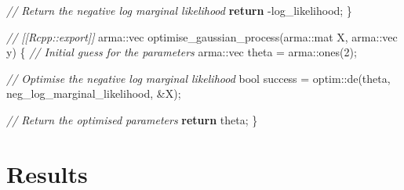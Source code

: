 \documentclass[
]{article}
\newenvironment{Shaded}{\begin{snugshade}}{\end{snugshade}}
\newcommand{\CommentTok}[1]{\textcolor[rgb]{0.56,0.35,0.01}{\textit{#1}}}
\newcommand{\ControlFlowTok}[1]{\textcolor[rgb]{0.13,0.29,0.53}{\textbf{#1}}}
\newcommand{\DataTypeTok}[1]{\textcolor[rgb]{0.13,0.29,0.53}{#1}}
\newcommand{\DecValTok}[1]{\textcolor[rgb]{0.00,0.00,0.81}{#1}}
\newcommand{\NormalTok}[1]{#1}
\begin{document}
\begin{Shaded}
\begin{Highlighting}[]
    \CommentTok{// Return the negative log marginal likelihood}
    \ControlFlowTok{return}\NormalTok{ {-}log\_likelihood;}
\NormalTok{\}}

\CommentTok{// [[Rcpp::export]]}
\NormalTok{arma::vec optimise\_gaussian\_process(arma::mat X, arma::vec y) \{}
    \CommentTok{// Initial guess for the parameters}
\NormalTok{    arma::vec theta = arma::ones(}\DecValTok{2}\NormalTok{);}

    \CommentTok{// Optimise the negative log marginal likelihood}
    \DataTypeTok{bool}\NormalTok{ success = optim::de(theta, neg\_log\_marginal\_likelihood, \&X);}

    \CommentTok{// Return the optimised parameters}
    \ControlFlowTok{return}\NormalTok{ theta;}
\NormalTok{\}}
\end{Highlighting}
\end{Shaded}

\hypertarget{results}{%
\section{Results}\label{results}}
\end{document}
